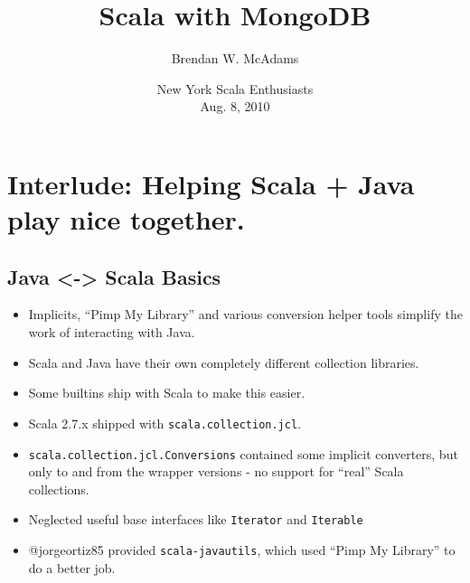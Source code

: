 \documentclass{beamer}
\title[Integrating Scala + MongoDB]{Scala with MongoDB} %
\author[B.W. McAdams]{Brendan W. McAdams}
\institute[Novus Partners]{Novus Partners, Inc.}
\date[NY Scala Enthusiasts - 8/8/10]
     {New York Scala Enthusiasts\\ Aug. 8, 2010}
\newenvironment{itemizeframe}
               {\begin{frame}\startitemizeframe} 
               {\stopitemizeframe\end{frame}}
\newcommand\startitemizeframe{\begin{itemize}} \newcommand\stopitemizeframe{\end{itemize}}
\begin{document}
\section{Interlude: Helping Scala + Java play nice together.}
\subsection{Java <-> Scala Basics}
\begin{itemizeframe}
    \frametitle{Helping Java + Scala Interact}
    \item Implicits, ``Pimp My Library'' and various conversion helper tools simplify the work of interacting with Java.
    \item<2-> Scala and Java have their own completely different collection libraries. 
    \item<3-> Some builtins ship with Scala to make this easier.
\end{itemizeframe}


\begin{itemizeframe}
    \frametitle{Interoperability in Scala 2.7.x}
    \item Scala 2.7.x shipped with \texttt{scala.collection.jcl}.
    \item<2-> \texttt{scala.collection.jcl.Conversions} contained some implicit converters, but only to and from the wrapper versions - no support for ``real'' Scala collections.
    \item<3-> Neglected useful base interfaces like \texttt{Iterator} and \texttt{Iterable}
    \item<3-> @jorgeortiz85 provided \texttt{scala-javautils}, which used ``Pimp My Library'' to do a better job.
\end{itemizeframe}
\end{document}
